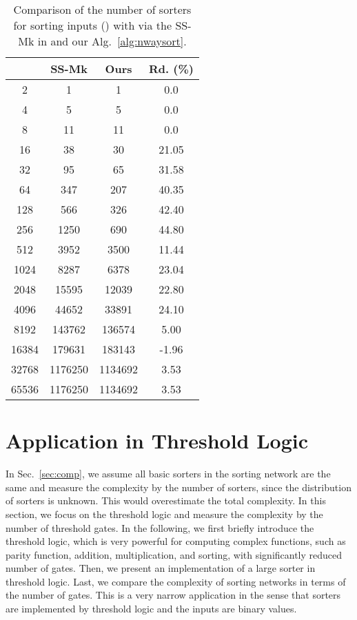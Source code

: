 \documentclass[10pt,journal,cspaper,compsoc]{IEEEtran}
\begin{document}
\begin{table}[!t]
\caption{Comparison of the number of sorters for sorting  inputs () with  via the SS-Mk in \cite{gao1997sloping} and our Alg.~\ref{alg:nwaysort}.}\label{tab:complexity_n20}
\begin{center}
\begin{tabular}{|c|c|c|c|}
\hline
 & SS-Mk & Ours & Rd. (\%)\\
\hline
2	&	1   &   1	&	0.0	\\
\hline
4	&	5   &   5	&	0.0	\\
\hline
8	&	11   &     11	&	0.0	\\
\hline
16	&	38  &   30	&	21.05\\
\hline
32	&	95  &   65	&	31.58\\
\hline
64	&	347    &   207	&	40.35\\
\hline
128	&	566   &   326	&	42.40\\
\hline
256	&	1250	&    690	&	44.80\\
\hline
512	&	3952   &   3500	&	11.44\\
\hline
1024	&	8287   &   6378	&	23.04	\\
\hline
2048	&	15595	&   12039	&	22.80 \\
\hline
4096	&	44652	&   33891	&	24.10 \\
\hline
8192	&	143762	&   136574	&	5.00\\
\hline
16384   &   179631  &   183143  &   -1.96 \\
\hline
32768   &   1176250 &   1134692 &   3.53 \\
\hline
65536   &   1176250 &   1134692 &   3.53 \\
\hline
\end{tabular}
\end{center}
\end{table}



\section{Application in Threshold Logic}
\label{sec:appl}
In Sec.~\ref{sec:comp}, we assume all basic sorters in the sorting network are the same and measure the complexity by the number of sorters, since the distribution of sorters is unknown. This would overestimate the total complexity.
In this section, we focus on the threshold logic and measure the complexity by the number of threshold gates.
In the following, we first briefly introduce the threshold logic, which is very powerful for computing complex functions, such as parity function, addition, multiplication, and sorting, with significantly reduced number of gates. Then, we present an implementation of a large sorter in threshold logic. Last, we compare the complexity of sorting networks in terms of the number of gates.
This is a very narrow application in the sense that sorters are implemented by threshold logic and the inputs are binary values.
\end{document}
